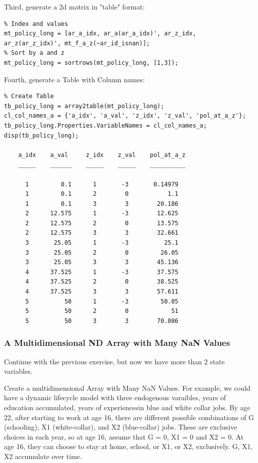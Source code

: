 \documentclass[
]{book}
\begin{document}
Third, generate a 2d matrix in "table" format:

\begin{verbatim}
% Index and values
mt_policy_long = [ar_a_idx, ar_a(ar_a_idx)', ar_z_idx, ar_z(ar_z_idx)', mt_f_a_z(~ar_id_isnan)];
% Sort by a and z
mt_policy_long = sortrows(mt_policy_long, [1,3]);
\end{verbatim}

Fourth, generate a Table with Column names:

\begin{verbatim}
% Create Table
tb_policy_long = array2table(mt_policy_long);
cl_col_names_a = {'a_idx', 'a_val', 'z_idx', 'z_val', 'pol_at_a_z'};
tb_policy_long.Properties.VariableNames = cl_col_names_a;
disp(tb_policy_long);

    a_idx    a_val     z_idx    z_val    pol_at_a_z
    _____    ______    _____    _____    __________

      1         0.1      1       -3       0.14979  
      1         0.1      2        0           1.1  
      1         0.1      3        3        20.186  
      2      12.575      1       -3        12.625  
      2      12.575      2        0        13.575  
      2      12.575      3        3        32.661  
      3       25.05      1       -3          25.1  
      3       25.05      2        0         26.05  
      3       25.05      3        3        45.136  
      4      37.525      1       -3        37.575  
      4      37.525      2        0        38.525  
      4      37.525      3        3        57.611  
      5          50      1       -3         50.05  
      5          50      2        0            51  
      5          50      3        3        70.086  
\end{verbatim}

\hypertarget{a-multidimensional-nd-array-with-many-nan-values}{%
\subsubsection{A Multidimensional ND Array with Many NaN Values}\label{a-multidimensional-nd-array-with-many-nan-values}}

Continue with the previous exercise, but now we have more than 2 state
variables.

Create a multidimensional Array with Many NaN Values. For example, we
could have a dynamic lifecycle model with three endogenous varaibles,
years of education accumulated, years of experiencesin blue and white
collar jobs. By age 22, after starting to work at age 16, there are
different possible combinations of G (schooling), X1 (white-collar), and
X2 (blue-collar) jobs. These are exclusive choices in each year, so at
age 16, assume that G = 0, X1 = 0 and X2 = 0. At age 16, they can choose
to stay at home, school, or X1, or X2, exclusively. G, X1, X2 accumulate
over time.
\end{document}
